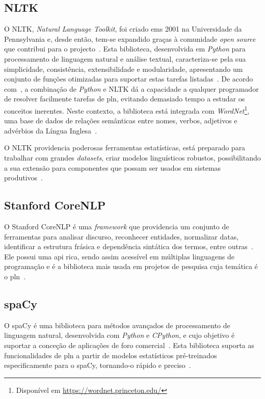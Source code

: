 \subsection{NLTK}
O NLTK, \textit{Natural Language Toolkit}, foi criado ems 2001 na Universidade da Pennsylvania e, desde então, tem-se expandido graças à comunidade \textit{open source} que contribui para o projecto~\parencite{applied_natural_language_processing_with_python}. Esta biblioteca, desenvolvida em \textit{Python} para processamento de linguagem natural e análise textual, caracteriza-se pela sua simplicidade, consistência, extensibilidade e modularidade, apresentando um conjunto de funções otimizadas para suportar estas tarefas listadas~\parencite{applied_natural_language_processing_with_python, python_text_processing_nltk_cookbook}. De acordo com~\textcite{nltk_education_scientific_purposes}, a combinação de \textit{Python} e NLTK dá a capacidade a qualquer programador de resolver facilmente tarefas de \gls{pln}, evitando demasiado tempo a  estudar os conceitos inerentes. Neste contexto, a biblioteca está integrada com \textit{WordNet}\footnote{Disponível em \url{https://wordnet.princeton.edu/}}, uma base de dados de relações semânticas entre nomes, verbos, adjetivos e advérbios da Língua Inglesa~\parencite{nltk_education_scientific_purposes}.

O NLTK providencia poderosas ferramentas estatísticas, está preparado para trabalhar com grandes \textit{datasets}, criar modelos linguísticos robustos, possibilitando a sua extensão para componentes que possam ser usados em sistemas produtivos~\parencite{nltk_education_scientific_purposes, applied_natural_language_processing_with_python}.

\subsection{Stanford CoreNLP}
O Stanford CoreNLP é uma \textit{framework} que providencia um conjunto de ferramentas para analisar discurso, reconhecer entidades, normalizar datas, identificar a estrutura frásica e dependência sintática dos termos, entre outras~\parencite{stanford_open_nlp}. Ele possui uma \gls{api} rica, sendo assim acessível em múltiplas linguagens de programação e é a biblioteca mais usada em projetos de pesquisa cuja temática é o \gls{pln}~\parencite{stanford_open_nlp, choosing_nlp_library}.

\subsection{spaCy}
O spaCy é uma biblioteca para métodos avançados de processamento de linguagem natural, desenvolvida com \textit{Python} e \textit{CPython}, e cujo objetivo é suportar a conceção de aplicações de foro comercial~\parencite{choosing_nlp_library}. Esta biblioteca suporta as funcionalidades de \gls{pln} a partir de modelos estatísticos pré-treinados especificamente para o spaCy, tornando-o rápido e preciso~\parencite{spacy_usage}.

